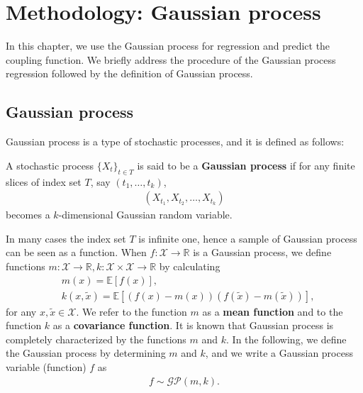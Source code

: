 \section{Methodology: Gaussian process}
\label{sec:method}
In this chapter, we use the Gaussian process for regression and predict the coupling function.
We briefly address the procedure of the Gaussian process regression followed by the definition of Gaussian process.


\subsection{Gaussian process}
Gaussian process is a type of stochastic processes, and it is defined as follows:
\begin{define}
A stochastic process $\{X_{t}\}_{t\in T}$ is said to be a \textbf{Gaussian process}
if for any finite slices of index set $T$, say $(t_{1},\dots,t_{k})$,
\begin{align}
    (X_{t_{1}}, X_{t_{2}}, \dots, X_{t_{k}})
\end{align}
becomes a $k$-dimensional Gaussian random variable.
\end{define}
In many cases the index set $T$ is infinite one, hence a sample of Gaussian process can be seen as a function.
When $f\colon\mathcal{X}\to\mathbb{R}$ is a Gaussian process, we define functions $m\colon\mathcal{X}\to\mathbb{R}, k\colon\mathcal{X}\times\mathcal{X}\to\mathbb{R}$ by calculating
\begin{align}
    &m(x)=\mathbb{E}[f(x)],\\
    &k(x,\tilde{x})=\mathbb{E}[(f(x)-m(x))(f(\tilde{x})-m(\tilde{x}))],
\end{align}
for any $x,\tilde{x}\in\mathcal{X}$.
We refer to the function $m$ as a \textbf{mean function} and to the function $k$ as a \textbf{covariance function}.
It is known that Gaussian process is completely characterized by the functions $m$ and $k$.
In the following, we define the Gaussian process by determining $m$ and $k$,
and we write a Gaussian process variable (function) $f$ as
\begin{align}
    f\sim\mathcal{GP}(m,k).
\end{align}

